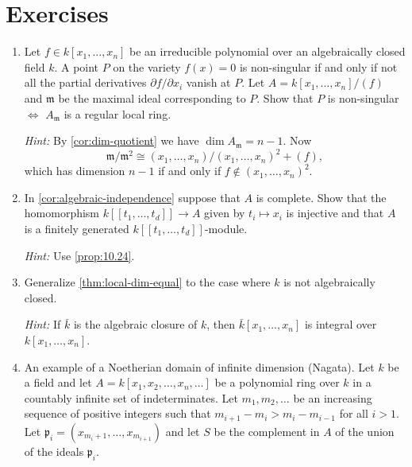 \section*{Exercises}

\begin{enumerate}
    \item \label{exer1-chapter11}Let $f \in k[x_1, \ldots, x_n]$ be an irreducible polynomial over an algebraically closed field $k$. A point $P$ on the variety $f(x) = 0$ is non-singular if and only if not all the partial derivatives $\partial f/\partial x_i$ vanish at $P$. Let $A = k[x_1, \ldots, x_n]/(f)$ and $\mathfrak{m}$ be the maximal ideal corresponding to $P$. Show that $P$ is non-singular $\iff$ $A_{\mathfrak{m}}$ is a regular local ring.
    
    \textit{Hint:} By \eqref{cor:dim-quotient} we have $\dim A_{\mathfrak{m}} = n-1$. Now \[\mathfrak{m}/\mathfrak{m}^2 \cong (x_1, \ldots, x_n)/(x_1, \ldots, x_n)^2 + (f),\] which has dimension $n-1$ if and only if $f \notin (x_1, \ldots, x_n)^2$.

    \item \label{exer2-chapter11}In \eqref{cor:algebraic-independence} suppose that $A$ is complete. Show that the homomorphism $k[[t_1, \ldots, t_d]] \to A$ given by $t_i \mapsto x_i$ is injective and that $A$ is a finitely generated $k[[t_1, \ldots, t_d]]$-module.
    
    \textit{Hint:} Use \eqref{prop:10.24}.

    \item \label{exer3-chapter11}Generalize \eqref{thm:local-dim-equal} to the case where $k$ is not algebraically closed.
    
    \textit{Hint:} If $\bar{k}$ is the algebraic closure of $k$, then $\bar{k}[x_1, \ldots, x_n]$ is integral over $k[x_1, \ldots, x_n]$.

    \item \label{exer4-chapter11}An example of a Noetherian domain of infinite dimension (Nagata). Let $k$ be a field and let $A = k[x_1, x_2, \ldots, x_n, \ldots]$ be a polynomial ring over $k$ in a countably infinite set of indeterminates. Let $m_1, m_2, \ldots$ be an increasing sequence of positive integers such that $m_{i+1} - m_i > m_i - m_{i-1}$ for all $i > 1$. Let $\mathfrak{p}_i = (x_{m_i+1}, \ldots, x_{m_{i+1}})$ and let $S$ be the complement in $A$ of the union of the ideals $\mathfrak{p}_i$.


\end{enumerate}
